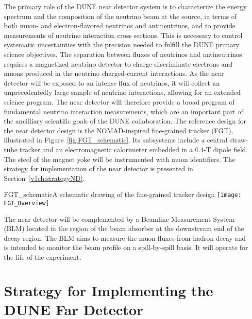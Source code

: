 The primary role of the DUNE near detector system is to characterize the energy spectrum and the composition of the neutrino beam at the source, in terms of
both muon- and electron-flavored neutrinos and antineutrinos, and to provide measurements of neutrino interaction cross sections. This is 
necessary to control systematic uncertainties with the precision needed to fulfill the DUNE primary science objectives.
The separation between fluxes of neutrinos and antineutrinos requires a magnetized neutrino detector to 
charge-discriminate electrons and muons produced in the neutrino charged-current interactions.
%
 As the near detector will be exposed to an intense flux of neutrinos, it will %
collect an unprecedentedly large sample of neutrino 
interactions, allowing for an extended science program. 
The near detector will therefore provide a broad program of fundamental neutrino interaction 
measurements, which are an important part of the ancilliary scientific goals of the DUNE collaboration. 
%
The reference design for the near detector design is the NOMAD-inspired fine-grained tracker (FGT), illustrated in Figure~\ref{fig:FGT_schematic}. Its subsystems include a central 
straw-tube tracker and an electromagnetic calorimeter embedded in a 0.4-T dipole field. The steel of the
magnet yoke will be instrumented with muon identifiers. The strategy for implementation of
the near detector is presented in Section~\ref{v1ch:strategyND}.

\begin{cdrfigure}{FGT_schematic}{A schematic drawing of the fine-grained tracker design}
\texttt{[image: FGT\_Overview]}
\end{cdrfigure}


The near detector will be complemented by a Beamline Measurement System (BLM) located in the region of the beam absorber at the downstream end of the decay region. The BLM aims to measure the muon fluxes from hadron decay and
 is intended to monitor the beam profile on a spill-by-spill basis. It will operate for the life of the experiment.

\section{Strategy for Implementing the DUNE Far Detector}
\label{v1ch3:fd-impl-strategy}



